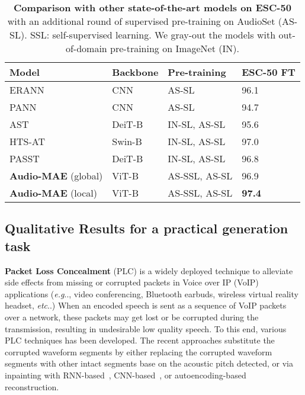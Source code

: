 \documentclass{article}
\makeatletter
\DeclareRobustCommand\onedot{\futurelet\@let@token\@onedot}
\def\@onedot{\ifx\@let@token.\else.\null\fi\xspace}
\def\eg{\emph{e.g}\onedot} \def\Eg{\emph{E.g}\onedot}
\def\etc{\emph{etc}\onedot} \def\vs{\emph{vs}\onedot}
\renewcommand{\paragraph}[1]{\vspace{1.25mm}\noindent\textbf{#1}}
\makeatother
\begin{document}
\begin{table}[h!]
\setlength\tabcolsep{3.0pt}
\small
\begin{center}
\begin{tabular}{llll} 
\multicolumn{1}{l}{Model} & \multicolumn{1}{l}{Backbone} & Pre-training & ESC-50 FT\\
\midrule
ERANN~\cite{verbitskiy2021eranns} & CNN & AS-SL & 96.1\\
PANN~\cite{kong2019panns} & CNN & AS-SL & 94.7  \\
\color{gray}AST~\cite{gong2021ast} & \color{gray}DeiT-B & \color{gray}IN-SL, AS-SL & \color{gray}95.6 \\ 
\color{gray}HTS-AT~\cite{chen2022hts} & \color{gray}Swin-B & \color{gray}IN-SL, AS-SL & \color{gray}97.0 \\
\color{gray}PASST~\cite{paast} & \color{gray}DeiT-B & \color{gray}IN-SL, AS-SL &  \color{gray}96.8\\
\rowcolor{gray!20} \textbf{Audio-MAE} (global)  & ViT-B & AS-SSL, AS-SL & 96.9 \\
\rowcolor{gray!30} \textbf{Audio-MAE} (local) & ViT-B & AS-SSL, AS-SL & \textbf{97.4}\\
\end{tabular}
\vspace{5pt}
\caption{\textbf{Comparison with other state-of-the-art models on ESC-50} with an additional round of supervised pre-training on AudioSet (AS-SL). SSL: self-supervised learning. We {\color{gray}gray-out} the models with out-of-domain pre-training on ImageNet (IN).}
\label{tab:supp:ft_esc}
\end{center}
\end{table}









\subsection{Qualitative Results for a practical generation task}
\label{sec:app:exp:plc}

\paragraph{Packet Loss Concealment} (PLC) is a widely deployed technique to alleviate side effects from missing or corrupted packets in Voice over IP (VoIP) applications (\eg, video conferencing, Bluetooth earbuds, wireless virtual reality headset, \etc) When an encoded speech is sent as a sequence of VoIP packets over a network, these packets may get lost or be corrupted during the transmission, resulting in undesirable low quality speech. To this end, various PLC techniques has been developed. The recent approaches substitute the corrupted waveform segments by either replacing the corrupted waveform segments with other intact segments base on the acoustic pitch detected, or via inpainting with RNN-based~\cite{LeeC16}, CNN-based~\cite{plc_wang}, or autoencoding-based~\cite{audio_inpainting,MarafiotiPHM19} reconstruction.
\end{document}
